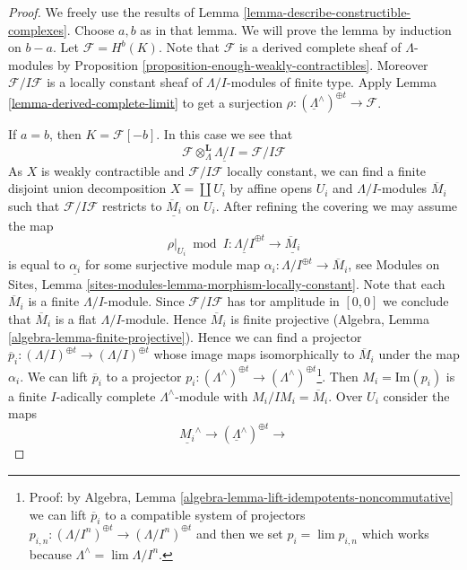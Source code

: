 \begin{proof}
We freely use the results of
Lemma \ref{lemma-describe-constructible-complexes}.
Choose $a, b$ as in that lemma. We will prove the lemma by
induction on $b - a$. Let $\mathcal{F} = H^b(K)$.
Note that $\mathcal{F}$ is a derived complete sheaf of
$\Lambda$-modules by
Proposition \ref{proposition-enough-weakly-contractibles}.
Moreover $\mathcal{F}/I\mathcal{F}$ is a locally
constant sheaf of $\Lambda/I$-modules of finite type.
Apply Lemma \ref{lemma-derived-complete-limit} to get a surjection
$\rho : (\underline{\Lambda}^\wedge)^{\oplus t} \to \mathcal{F}$.

\medskip\noindent
If $a = b$, then $K = \mathcal{F}[-b]$. In this case we see that
$$
\mathcal{F} \otimes_\Lambda^\mathbf{L} \underline{\Lambda/I} =
\mathcal{F}/I\mathcal{F}
$$
As $X$ is weakly contractible and $\mathcal{F}/I\mathcal{F}$
locally constant, we can find a finite disjoint
union decomposition $X = \coprod U_i$ by affine opens $U_i$
and $\Lambda/I$-modules $\overline{M}_i$
such that $\mathcal{F}/I\mathcal{F}$ restricts to
$\underline{\overline{M}_i}$ on $U_i$. After refining the covering
we may assume the map
$$
\rho|_{U_i} \bmod I :
\underline{\Lambda/I}^{\oplus t}
\longrightarrow
\underline{\overline{M}_i}
$$
is equal to $\underline{\alpha_i}$ for some surjective module map
$\alpha_i : \Lambda/I^{\oplus t} \to \overline{M}_i$, see
Modules on Sites, Lemma \ref{sites-modules-lemma-morphism-locally-constant}.
Note that each $\overline{M}_i$ is a finite $\Lambda/I$-module.
Since $\mathcal{F}/I\mathcal{F}$ has tor amplitude in $[0, 0]$
we conclude that $\overline{M}_i$ is a flat $\Lambda/I$-module.
Hence $\overline{M}_i$ is finite projective
(Algebra, Lemma \ref{algebra-lemma-finite-projective}).
Hence we can find a projector
$\overline{p}_i : (\Lambda/I)^{\oplus t} \to (\Lambda/I)^{\oplus t}$
whose image maps isomorphically to $\overline{M}_i$ under the map $\alpha_i$.
We can lift $\overline{p}_i$ to a projector
$p_i : (\Lambda^\wedge)^{\oplus t} \to
(\Lambda^\wedge)^{\oplus t}$\footnote{Proof: by
Algebra, Lemma \ref{algebra-lemma-lift-idempotents-noncommutative}
we can lift $\overline{p}_i$ to a compatible system of
projectors $p_{i, n} : (\Lambda/I^n)^{\oplus t} \to (\Lambda/I^n)^{\oplus t}$
and then we set $p_i = \lim p_{i, n}$ which works because
$\Lambda^\wedge = \lim \Lambda/I^n$.}.
Then $M_i = \text{Im}(p_i)$ is a finite $I$-adically complete
$\Lambda^\wedge$-module with $M_i/IM_i = \overline{M}_i$.
Over $U_i$ consider the maps
$$
\underline{M_i}^\wedge \to
(\underline{\Lambda}^\wedge)^{\oplus t} \to
$$
\end{proof}
